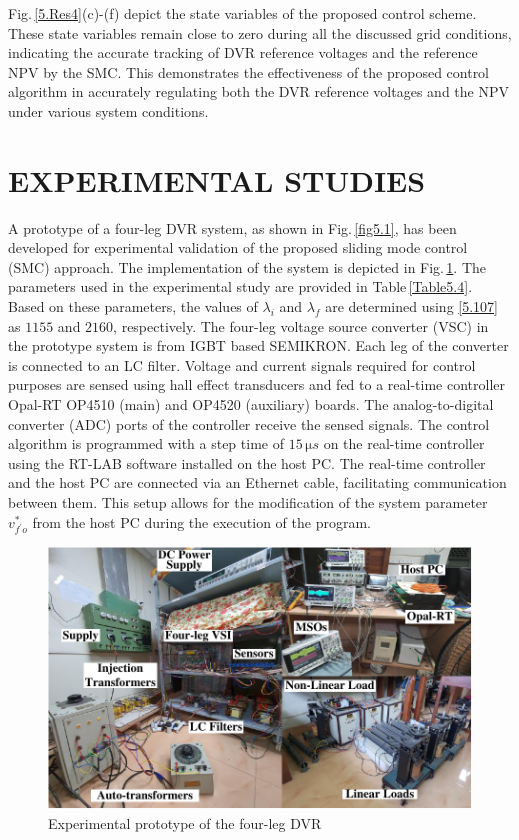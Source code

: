 Fig.\,\ref{5.Res4}(c)-(f) depict the state variables of the proposed control scheme. These state variables remain close to zero during all the discussed grid conditions, indicating the accurate tracking of DVR reference voltages and the reference NPV by the SMC. This demonstrates the effectiveness of the proposed control algorithm in accurately regulating both the DVR reference voltages and the NPV under various system conditions.


\section{EXPERIMENTAL STUDIES}
A prototype of a four-leg DVR system, as shown in Fig.\,\ref{fig5.1}, has been developed for experimental validation of the proposed sliding mode control (SMC) approach. The implementation of the system is depicted in Fig.\,\ref{fig5.11}. The parameters used in the experimental study are provided in Table\,\ref{Table5.4}. Based on these parameters, the values of $\lambda_i$ and $\lambda_f$ are determined using \eqref{5.107} as $1155$ and $2160$, respectively. The four-leg voltage source converter (VSC) in the prototype system is from IGBT based SEMIKRON. Each leg of the converter is connected to an LC filter. Voltage and current signals required for control purposes are sensed using hall effect transducers and fed to a real-time controller Opal-RT OP4510 (main) and OP4520 (auxiliary) boards. The analog-to-digital converter (ADC) ports of the controller receive the sensed signals. The control algorithm is programmed with a step time of $15\,\si{\micro s}$ on the real-time controller using the RT-LAB software installed on the host PC. The real-time controller and the host PC are connected via an Ethernet cable, facilitating communication between them. This setup allows for the modification of the system parameter $v^{*}_{f^\prime o}$ from the host PC during the execution of the program.
\begin{figure}[h!] %
	\centering
	\includegraphics[scale=0.9]{figures/Chapter_5/Mine/Hardware_Picture_modified}
	\caption{Experimental prototype of the four-leg DVR}  
	\label{fig5.11}
\end{figure} 

